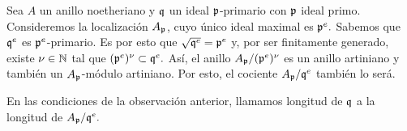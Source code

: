\documentclass[../main.tex]{subfiles}
\begin{document}
\begin{remark}
Sea $A$ un anillo noetheriano y $\mathfrak{q}$ un ideal $\mathfrak{p}$-primario con $\mathfrak{p}$ ideal primo. Consideremos la localización $A_{\mathfrak{p}}$, cuyo único ideal maximal es $\mathfrak{p}^e.$ Sabemos que $\mathfrak{q}^e$ es $\mathfrak{p}^e$-primario. Es por esto que $\sqrt{\mathfrak{q}^e}=\mathfrak{p}^e$ y, por ser finitamente generado, existe $\nu\in\mathbb{N}$ tal que $(\mathfrak{p}^e)^\nu\subset \mathfrak{q}^e.$ Así, el anillo $A_{\mathfrak{p}}/(\mathfrak{p}^e)^\nu$ es un anillo artiniano y también un $A_{\mathfrak{p}}$-módulo artiniano. Por esto, el cociente $A_{\mathfrak{p}}/\mathfrak{q}^e$ también lo será.
\end{remark}

\begin{definition}
En las condiciones de la observación anterior, llamamos longitud de $\mathfrak{q}$ a la longitud de $A_{\mathfrak{p}}/\mathfrak{q}^e.$
\end{definition}
\end{document}
